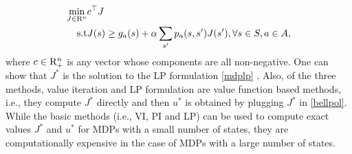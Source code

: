 \small
\begin{align}\label{mdplp}
\min_{J\in \R^n} &c^\top J\nn\\
\text{s.t}\mb &J(s)\geq g_a(s)+\alpha\sum_{s'}p_a(s,s')J(s'), \mb\forall s\in S, a \in A,
\end{align}
\normalsize
where $c\in \mathrm{R}^n_+$ is any vector whose components are all non-negative. One can show that $J^*$ is the solution to the LP formulation \eqref{mdplp} \cite{BertB}. 
Also, of the three methods, value iteration and LP formulation are value function based methods, i.e., they compute $J^*$ directly and then $u^*$ is obtained by plugging $J^*$ in \eqref{bellpol}.\\
While the basic methods (i.e., VI, PI and LP) can be used to compute exact values $J^*$ and $u^*$ for MDPs with a small number of states, they are computationally expensive in the case of MDPs with a large number of states.\\
